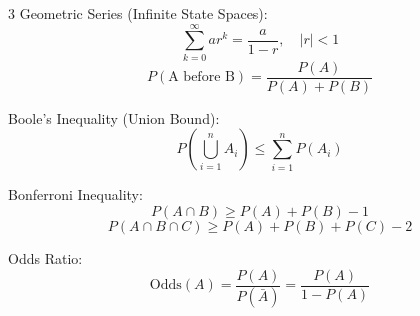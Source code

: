\documentclass[10pt,landscape]{article}
\begin{document}
\begin{multicols*}{3}
Geometric Series (Infinite State Spaces):
$$ \sum_{k=0}^\infty a r^k = \frac{a}{1-r}, \quad |r| < 1 $$
$$ P(\text{A before B}) = \frac{P(A)}{P(A) + P(B)} $$

Boole's Inequality (Union Bound):
$$ P\left(\bigcup_{i=1}^n A_i\right) \le \sum_{i=1}^n P(A_i) $$

Bonferroni Inequality:
$$ P(A \cap B) \ge P(A) + P(B) - 1 $$
$$ P(A \cap B \cap C) \ge P(A) + P(B) + P(C) - 2 $$

Odds Ratio:
$$ \text{Odds}(A) = \frac{P(A)}{P(\bar{A})} = \frac{P(A)}{1 - P(A)} $$

\end{multicols*}
\end{document}
